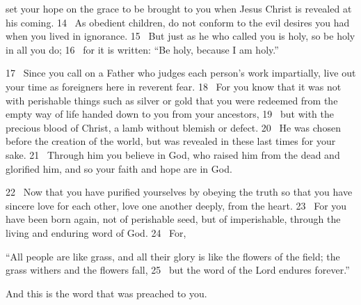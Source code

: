 set your hope
on the grace to be brought to you
when Jesus Christ is revealed at his coming.
14  As obedient
children, do not conform
to the evil desires you had when you lived in ignorance.
15  But just as he who called you is holy, so be holy in all you do;
16  for it is written: “Be holy, because I am holy.”
\par
17  Since you call on a Father
who judges each person’s work
impartially,
live out your time as foreigners
here in reverent fear.
18  For you know that it was not with perishable things such as silver or gold that you were redeemed
from the empty way of life
handed down to you from your ancestors,
19  but with the precious blood
of Christ, a lamb
without blemish or defect.
20  He was chosen before the creation of the world,
but was revealed in these last times
for your sake.
21  Through him you believe in God,
who raised him from the dead
and glorified him,
and so your faith and hope
are in God.
\par
22  Now that you have purified
yourselves by obeying
the truth so that you have sincere love for each other, love one another deeply,
from the heart.
23  For you have been born again,
not of perishable seed, but of imperishable,
through the living and enduring word of God.
24  For,
\par
“All people are like grass,
and all their glory is like the flowers of the field;
the grass withers and the flowers fall,
25 
but the word of the Lord endures forever.”
\par
And this is the word that was preached to you.


\bye

